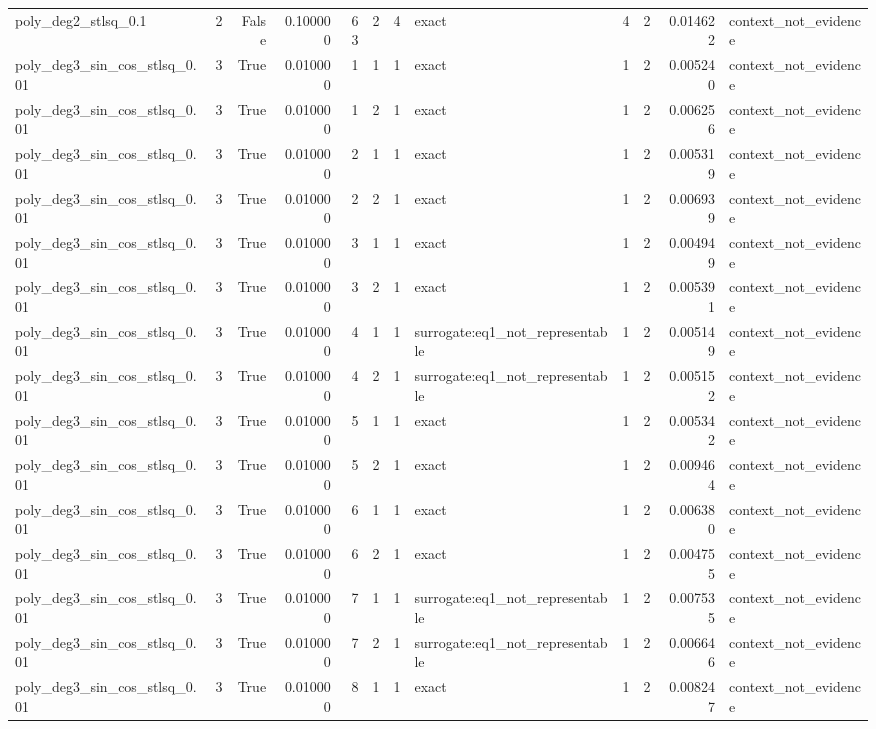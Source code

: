 \begin{tabular}{lrrrrrrlrrrl}
poly\_deg2\_stlsq\_0.1 & 2 & False & 0.100000 & 63 & 2 & 4 & exact & 4 & 2 & 0.014622 & context\_not\_evidence \\
poly\_deg3\_sin\_cos\_stlsq\_0.01 & 3 & True & 0.010000 & 1 & 1 & 1 & exact & 1 & 2 & 0.005240 & context\_not\_evidence \\
poly\_deg3\_sin\_cos\_stlsq\_0.01 & 3 & True & 0.010000 & 1 & 2 & 1 & exact & 1 & 2 & 0.006256 & context\_not\_evidence \\
poly\_deg3\_sin\_cos\_stlsq\_0.01 & 3 & True & 0.010000 & 2 & 1 & 1 & exact & 1 & 2 & 0.005319 & context\_not\_evidence \\
poly\_deg3\_sin\_cos\_stlsq\_0.01 & 3 & True & 0.010000 & 2 & 2 & 1 & exact & 1 & 2 & 0.006939 & context\_not\_evidence \\
poly\_deg3\_sin\_cos\_stlsq\_0.01 & 3 & True & 0.010000 & 3 & 1 & 1 & exact & 1 & 2 & 0.004949 & context\_not\_evidence \\
poly\_deg3\_sin\_cos\_stlsq\_0.01 & 3 & True & 0.010000 & 3 & 2 & 1 & exact & 1 & 2 & 0.005391 & context\_not\_evidence \\
poly\_deg3\_sin\_cos\_stlsq\_0.01 & 3 & True & 0.010000 & 4 & 1 & 1 & surrogate:eq1\_not\_representable & 1 & 2 & 0.005149 & context\_not\_evidence \\
poly\_deg3\_sin\_cos\_stlsq\_0.01 & 3 & True & 0.010000 & 4 & 2 & 1 & surrogate:eq1\_not\_representable & 1 & 2 & 0.005152 & context\_not\_evidence \\
poly\_deg3\_sin\_cos\_stlsq\_0.01 & 3 & True & 0.010000 & 5 & 1 & 1 & exact & 1 & 2 & 0.005342 & context\_not\_evidence \\
poly\_deg3\_sin\_cos\_stlsq\_0.01 & 3 & True & 0.010000 & 5 & 2 & 1 & exact & 1 & 2 & 0.009464 & context\_not\_evidence \\
poly\_deg3\_sin\_cos\_stlsq\_0.01 & 3 & True & 0.010000 & 6 & 1 & 1 & exact & 1 & 2 & 0.006380 & context\_not\_evidence \\
poly\_deg3\_sin\_cos\_stlsq\_0.01 & 3 & True & 0.010000 & 6 & 2 & 1 & exact & 1 & 2 & 0.004755 & context\_not\_evidence \\
poly\_deg3\_sin\_cos\_stlsq\_0.01 & 3 & True & 0.010000 & 7 & 1 & 1 & surrogate:eq1\_not\_representable & 1 & 2 & 0.007535 & context\_not\_evidence \\
poly\_deg3\_sin\_cos\_stlsq\_0.01 & 3 & True & 0.010000 & 7 & 2 & 1 & surrogate:eq1\_not\_representable & 1 & 2 & 0.006646 & context\_not\_evidence \\
poly\_deg3\_sin\_cos\_stlsq\_0.01 & 3 & True & 0.010000 & 8 & 1 & 1 & exact & 1 & 2 & 0.008247 & context\_not\_evidence \\

\end{tabular}
